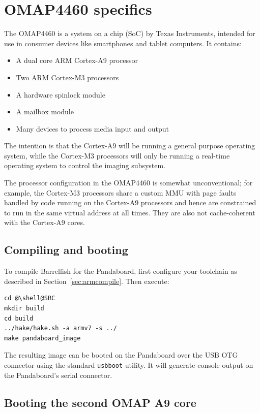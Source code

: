 \documentclass[a4paper,twoside]{report} %
\begin{document}
\chapter{OMAP4460 specifics}


The OMAP4460 is a system on a chip (SoC) by Texas Instruments,
intended for use in consumer devices like smartphones and tablet
computers. It contains:

\begin{itemize}
\item A dual core ARM Cortex-A9 processor
\item Two ARM Cortex-M3 processors
\item A hardware spinlock module
\item A mailbox module
\item Many devices to process media input and output
\end{itemize}

The intention is that the Cortex-A9 will be running a general purpose
operating system, while the Cortex-M3 processors will only be running
a real-time operating system to control the imaging subsystem.

The processor configuration in the OMAP4460 is somewhat
unconventional; for example, the Cortex-M3 processors share a
custom MMU with page faults handled by code running on the Cortex-A9
processors and hence are constrained to run in the same virtual
address at all times.  They are also not cache-coherent with the
Cortex-A9 cores. 

\section{Compiling and booting}

To compile Barrelfish for the Pandaboard, first configure your
toolchain as described in Section~\ref{sec:armcompile}. Then execute: 

\begin{lstlisting}
cd @\shell@SRC
mkdir build
cd build
../hake/hake.sh -a armv7 -s ../
make pandaboard_image
\end{lstlisting}

The resulting image can be booted on the Pandaboard over the USB OTG
connector using the standard \texttt{usbboot} utility.  It will
generate console output on the Pandaboard's serial connector.

\section{Booting the second OMAP A9 core}
\end{document}
